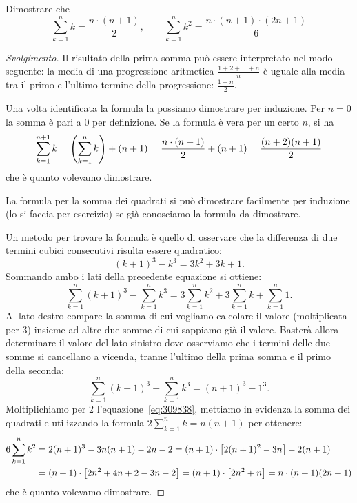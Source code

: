 \begin{exercise}
  Dimostrare che 
  \[
    \sum_{k=1}^n k = \frac{n\cdot (n+1)}{2}, \qquad
    \sum_{k=1}^n k^2 = \frac{n\cdot (n+1)\cdot (2n+1)}{6}
  \]
\end{exercise}
\begin{proof}[Svolgimento]
Il risultato della prima somma può essere interpretato nel modo seguente:
la media di una progressione aritmetica $\frac{1+2+ \dots + n}{n}$ 
è uguale alla media tra il primo 
e l'ultimo termine della progressione: $\frac{1+n}{2}$.

Una volta identificata la formula la possiamo dimostrare per induzione.
Per $n=0$ la somma è pari a $0$ per definizione.
Se la formula è vera per un certo $n$, si ha 
\[
  \sum_{k=1}^{n+1} k = {\left( \sum_{k=1}^n k \right)} + (n+1)
   = \frac{n\cdot(n+1)}{2} + (n+1) 
   = \frac{(n+2)(n+1)}{2}
\]
che è quanto volevamo dimostrare.

La formula per la somma dei quadrati si può dimostrare facilmente per 
induzione (lo si faccia per esercizio) se già conosciamo la formula da 
dimostrare.

Un metodo per trovare la formula è quello di osservare che la differenza 
di due termini cubici consecutivi risulta essere quadratico:
\[
(k+1)^3 - k^3 = 3 k^2 + 3k + 1.  
\]
Sommando ambo i lati della precedente equazione si ottiene:
\begin{equation}\label{eq:309838}
\sum_{k=1}^n (k+1)^3 - \sum_{k=1}^n k^3 
= 3\sum_{k=1}^n k^2+3\sum_{k=1}^n k+\sum_{k=1}^n 1.
\end{equation}
Al lato destro compare la somma di cui vogliamo calcolare il valore 
(moltiplicata per $3$)
insieme ad altre due somme di cui sappiamo già il valore. 
Basterà allora determinare il valore del lato sinistro dove 
osserviamo che i termini delle due somme si cancellano 
a vicenda,
tranne l'ultimo della prima somma 
e il primo della seconda: 
\[
  \sum_{k=1}^n(k+1)^3 - \sum_{k=1}^n k^3 = (n+1)^3 - 1^3.
\]
Moltiplichiamo per $2$ l'equazione~\eqref{eq:309838},
mettiamo in evidenza la somma dei quadrati e 
utilizzando la formula $2\sum_{k=1}^n k = n(n+1)$
per ottenere:
\begin{align*}
  6 \sum_{k=1}^n k^2 
  &=  2(n+1)^3 - 3 n(n+1) - 2n - 2
  = (n+1) \cdot {\left[ 2(n+1)^2 - 3n \right]} - 2(n+1)\\
  &= (n+1)\cdot {\left[ 2n^2+4n+2 -3n - 2 \right]}
   = (n+1)\cdot {\left[ 2n^2+n \right]} 
   = n \cdot (n+1)(2n+1)
\end{align*}
che è quanto volevamo dimostrare.
\end{proof}

